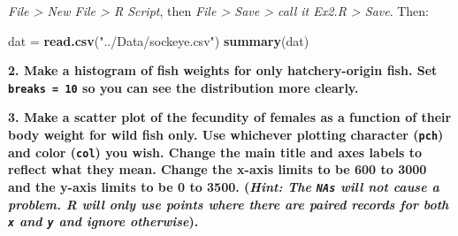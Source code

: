 \documentclass[]{book}
\newenvironment{Shaded}{\begin{snugshade}}{\end{snugshade}}
\newcommand{\KeywordTok}[1]{\textcolor[rgb]{0.13,0.29,0.53}{\textbf{#1}}}
\newcommand{\DataTypeTok}[1]{\textcolor[rgb]{0.13,0.29,0.53}{#1}}
\newcommand{\DecValTok}[1]{\textcolor[rgb]{0.00,0.00,0.81}{#1}}
\newcommand{\FloatTok}[1]{\textcolor[rgb]{0.00,0.00,0.81}{#1}}
\newcommand{\StringTok}[1]{\textcolor[rgb]{0.31,0.60,0.02}{#1}}
\newcommand{\OperatorTok}[1]{\textcolor[rgb]{0.81,0.36,0.00}{\textbf{#1}}}
\newcommand{\NormalTok}[1]{#1}
\theoremstyle{definition}
\theoremstyle{definition}
\theoremstyle{definition}
\theoremstyle{remark}
\begin{document}
\emph{File \textgreater{} New File \textgreater{} R Script}, then
\emph{File \textgreater{} Save \textgreater{} call it Ex2.R
\textgreater{} Save}. Then:

\begin{Shaded}
\begin{Highlighting}[]
\NormalTok{dat =}\StringTok{ }\KeywordTok{read.csv}\NormalTok{(}\StringTok{"../Data/sockeye.csv"}\NormalTok{)}
\KeywordTok{summary}\NormalTok{(dat)}
\end{Highlighting}
\end{Shaded}

\textbf{2. Make a histogram of fish weights for only hatchery-origin
fish. Set \texttt{breaks\ =\ 10} so you can see the distribution more
clearly.}

\begin{Shaded}
\end{Shaded}

\textbf{3. Make a scatter plot of the fecundity of females as a function
of their body weight for wild fish only. Use whichever plotting
character (\texttt{pch}) and color (\texttt{col}) you wish. Change the
main title and axes labels to reflect what they mean. Change the x-axis
limits to be 600 to 3000 and the y-axis limits to be 0 to 3500.
(\emph{Hint: The \texttt{NAs} will not cause a problem. R will only use
points where there are paired records for both \texttt{x} and \texttt{y}
and ignore otherwise}).}

\begin{Shaded}
\end{Shaded}
\end{document}
